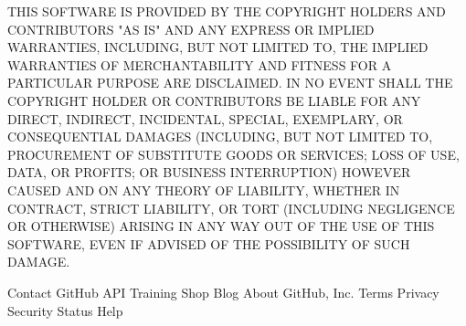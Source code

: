 \documentclass[\docopts]{\docclass}
\begin{document}
THIS SOFTWARE IS PROVIDED BY THE COPYRIGHT HOLDERS AND CONTRIBUTORS "AS IS"
AND ANY EXPRESS OR IMPLIED WARRANTIES, INCLUDING, BUT NOT LIMITED TO, THE
IMPLIED WARRANTIES OF MERCHANTABILITY AND FITNESS FOR A PARTICULAR PURPOSE ARE
DISCLAIMED. IN NO EVENT SHALL THE COPYRIGHT HOLDER OR CONTRIBUTORS BE LIABLE
FOR ANY DIRECT, INDIRECT, INCIDENTAL, SPECIAL, EXEMPLARY, OR CONSEQUENTIAL
DAMAGES (INCLUDING, BUT NOT LIMITED TO, PROCUREMENT OF SUBSTITUTE GOODS OR
SERVICES; LOSS OF USE, DATA, OR PROFITS; OR BUSINESS INTERRUPTION) HOWEVER
CAUSED AND ON ANY THEORY OF LIABILITY, WHETHER IN CONTRACT, STRICT LIABILITY,
OR TORT (INCLUDING NEGLIGENCE OR OTHERWISE) ARISING IN ANY WAY OUT OF THE USE
OF THIS SOFTWARE, EVEN IF ADVISED OF THE POSSIBILITY OF SUCH DAMAGE.

Contact GitHub API Training Shop Blog About  GitHub, Inc. Terms Privacy Security Status Help





\end{document}
